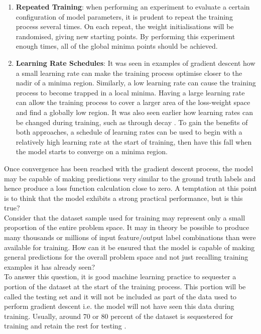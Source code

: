 \begin{enumerate}
    \item \textbf{Repeated Training}: when performing an experiment to evaluate a certain configuration of model parameters, it is prudent to repeat the training process several times. On each repeat, the weight initialisations will be randomised, giving new starting points. By performing this experiment enough times, all of the global minima points should be achieved.
    
    \item \textbf{Learning Rate Schedules}: It was seen in examples of gradient descent how a small learning rate can make the training process optimise closer to the nadir of a minima region. Similarly, a low learning rate can cause the training process to become trapped in a local minima. Having a large learning rate can allow the training process to cover a larger area of the loss-weight space and find a globally low region. It was also seen earlier how learning rates can be changed during training, such as through decay \cite{you2019does}. To gain the benefits of both approaches, a schedule of learning rates can be used \cite{xu2019learning} to begin with a relatively high learning rate at the start of training, then have this fall when the model starts to converge on a minima region.
    
\end{enumerate}

\noindent
Once convergence has been reached with the gradient descent process, the model may be capable of making predictions very similar to the ground truth labels and hence produce a loss function calculation close to zero. A temptation at this point is to think that the model exhibits a strong practical performance, but is this true? \\

\noindent
Consider that the dataset sample used for training may represent only a small proportion of the entire problem space. It may in theory be possible to produce many thousands or millions of input feature/output label combinations than were available for training. How can it be ensured that the model is capable of making general predictions for the overall problem space and not just recalling training examples it has already seen? \\

\noindent
To answer this question, it is good machine learning practice to sequester a portion of the dataset at the start of the training process. This portion will be called the testing set and it will not be included as part of the data used to perform gradient descent i.e. the model will not have seen this data during training. Usually, around 70 or 80 percent of the dataset is sequestered for training and retain the rest for testing \cite{gholamy201870}.\\

